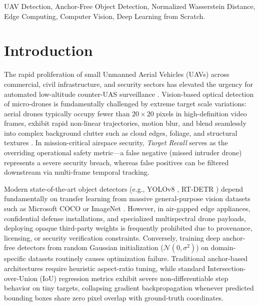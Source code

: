 \documentclass[conference]{IEEEtran}
\begin{document}
\begin{IEEEkeywords}
UAV Detection, Anchor-Free Object Detection, Normalized Wasserstein Distance, Edge Computing, Computer Vision, Deep Learning from Scratch.
\end{IEEEkeywords}

\section{Introduction}

The rapid proliferation of small Unmanned Aerial Vehicles (UAVs) across commercial, civil infrastructure, and security sectors has elevated the urgency for automated low-altitude counter-UAS surveillance \cite{redmon2018yolov3}. Vision-based optical detection of micro-drones is fundamentally challenged by extreme target scale variations: aerial drones typically occupy fewer than $20 \times 20$ pixels in high-definition video frames, exhibit rapid non-linear trajectories, motion blur, and blend seamlessly into complex background clutter such as cloud edges, foliage, and structural textures \cite{wang2021normalized}. In mission-critical airspace security, \textit{Target Recall} serves as the overriding operational safety metric—a false negative (missed intruder drone) represents a severe security breach, whereas false positives can be filtered downstream via multi-frame temporal tracking.

Modern state-of-the-art object detectors (e.g., YOLOv8 \cite{jocher2023ultralytics}, RT-DETR \cite{lv2023detrs}) depend fundamentally on transfer learning from massive general-purpose vision datasets such as Microsoft COCO \cite{lin2014microsoft} or ImageNet \cite{russakovsky2015imagenet}. However, in air-gapped edge appliances, confidential defense installations, and specialized multispectral drone payloads, deploying opaque third-party weights is frequently prohibited due to provenance, licensing, or security verification constraints. Conversely, training deep anchor-free detectors from random Gaussian initialization ($\mathcal{N}(0, \sigma^2)$) on domain-specific datasets routinely causes optimization failure. Traditional anchor-based architectures \cite{ren2015faster} require heuristic aspect-ratio tuning, while standard Intersection-over-Union (IoU) regression metrics exhibit severe non-differentiable step behavior on tiny targets, collapsing gradient backpropagation whenever predicted bounding boxes share zero pixel overlap with ground-truth coordinates.
\end{document}
